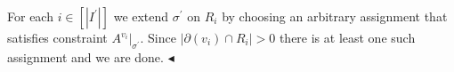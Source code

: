 \documentclass[10pt,a4paper]{article}
\begin{document}
For each $i\in[|I^{\prime}|]$ we extend $\sigma^{\prime}$ on $R_{i}$ by choosing an arbitrary assignment that satisfies
constraint $A^{v_{i}}|_{\sigma^{\prime}}$. Since $|\partial(v_{i})\cap R_{i}|>0$ there is at least one such assignment and we are
done.
$\blacktriangleleft$\par




\par
\end{document}
